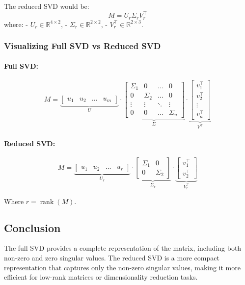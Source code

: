 \documentclass{article}
\begin{document}
The reduced SVD would be:
\[
M = U_r \Sigma_r V_r^\top
\]
where:
- \( U_r \in \mathbb{R}^{4 \times 2} \),
- \( \Sigma_r \in \mathbb{R}^{2 \times 2} \),
- \( V_r^\top \in \mathbb{R}^{2 \times 3} \).

\subsubsection{Visualizing Full SVD vs Reduced SVD}
\paragraph{Full SVD:}
\[
M = \underbrace{\begin{bmatrix} u_1 & u_2 & \dots & u_m \end{bmatrix}}_{U} \cdot \underbrace{\begin{bmatrix} \Sigma_1 & 0 & \dots & 0 \\ 0 & \Sigma_2 & \dots & 0 \\ \vdots & \vdots & \ddots & \vdots \\ 0 & 0 & \dots & \Sigma_n \end{bmatrix}}_{\Sigma} \cdot \underbrace{\begin{bmatrix} v_1^\top \\ v_2^\top \\ \vdots \\ v_n^\top \end{bmatrix}}_{V^\top}
\]

\paragraph{Reduced SVD:}
\[
M = \underbrace{\begin{bmatrix} u_1 & u_2 & \dots & u_r \end{bmatrix}}_{U_r} \cdot \underbrace{\begin{bmatrix} \Sigma_1 & 0 \\ 0 & \Sigma_2 \end{bmatrix}}_{\Sigma_r} \cdot \underbrace{\begin{bmatrix} v_1^\top \\ v_2^\top \end{bmatrix}}_{V_r^\top}
\]

Where \( r = \operatorname{rank}(M) \).

\subsection{Conclusion}
The full SVD provides a complete representation of the matrix, including both non-zero and zero singular values. The reduced SVD is a more compact representation that captures only the non-zero singular values, making it more efficient for low-rank matrices or dimensionality reduction tasks.
\end{document}
